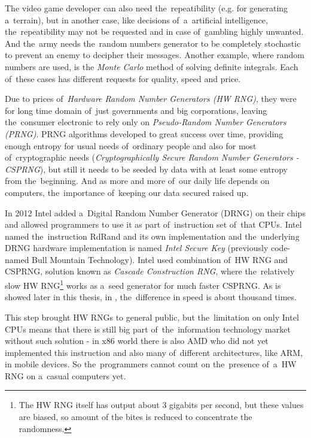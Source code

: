 The video game developer can also need the~repeatibility (e.g. for generating a~terrain), but in another case, like decisions of~a~artificial intelligence, the~repeatibility may not be requested and in case of~gambling highly unwanted. And the~army needs the~random numbers generator to be completely stochastic to prevent an enemy to decipher their messages. Another example, where random numbers are used, is the {\em Monte Carlo} method of solving definite integrals. Each of~these cases has different requests for quality, speed and price.

Due to prices of~{\em Hardware Random Number Generators (HW RNG)}, they were for long time domain of~just governments and big corporations,%
leaving the~consumer electronic to rely only on {\em Pseudo-Random Number Generators (PRNG)}. PRNG algorithms developed to great success over time, providing enough entropy for usual needs of~ordinary people and also for most of~cryptographic needs ({\em Cryptographically Secure Random Number Generators - CSPRNG}), but still it needs to be seeded by data with at least some entropy from the~beginning. And as more and more of~our daily life depends on computers, the~importance of~keeping our data secured raised up. 

In 2012\cite{IntelRdRandFindAbout} Intel added a~Digital Random Number Generator (DRNG) on their chips and allowed programmers to use it as part of~instruction set of~that CPUs. Intel named the~instruction RdRand and its own implementation and the~underlying DRNG hardware implementation is named {\em Intel Secure Key} (previously code-named Bull Mountain Technology)\cite{IntelDRNGAnalysis}. Intel used combination of~HW RNG and CSPRNG, solution known as {\em Cascade Construction RNG}, where the~relatively slow HW RNG\footnote{The HW RNG itself has output about 3 gigabits per second\cite{BehindRdRand}, but these values are biased, so amount of the bites is reduced to concentrate the randomness.} works as a~seed generator for much faster CSPRNG. As is showed later in this thesis, in , the~difference in speed is about thousand times.

This step brought HW RNGs to general public, but the~limitation on only Intel CPUs means that there is still big part of~the~information technology market without such solution - in x86 world there is also AMD who did not yet implemented this instruction and also many of~different architectures, like ARM, in mobile devices. So the~programmers cannot count on the~presence of~a~HW RNG on a~casual computers yet. 

